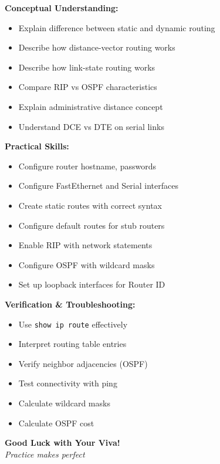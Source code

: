 \documentclass[12pt,a4paper]{article}
\begin{document}
\begin{tcolorbox}[colback=highlight!15,colframe=highlight,title=\textbf{Before Your Viva},rounded corners,breakable]
\textbf{Conceptual Understanding:}
\begin{itemize}[noitemsep]
    \item[$\Box$] Explain difference between static and dynamic routing
    \item[$\Box$] Describe how distance-vector routing works
    \item[$\Box$] Describe how link-state routing works
    \item[$\Box$] Compare RIP vs OSPF characteristics
    \item[$\Box$] Explain administrative distance concept
    \item[$\Box$] Understand DCE vs DTE on serial links
\end{itemize}

\vspace{0.3cm}
\textbf{Practical Skills:}
\begin{itemize}[noitemsep]
    \item[$\Box$] Configure router hostname, passwords
    \item[$\Box$] Configure FastEthernet and Serial interfaces
    \item[$\Box$] Create static routes with correct syntax
    \item[$\Box$] Configure default routes for stub routers
    \item[$\Box$] Enable RIP with network statements
    \item[$\Box$] Configure OSPF with wildcard masks
    \item[$\Box$] Set up loopback interfaces for Router ID
\end{itemize}

\vspace{0.3cm}
\textbf{Verification \& Troubleshooting:}
\begin{itemize}[noitemsep]
    \item[$\Box$] Use \texttt{show ip route} effectively
    \item[$\Box$] Interpret routing table entries
    \item[$\Box$] Verify neighbor adjacencies (OSPF)
    \item[$\Box$] Test connectivity with ping
    \item[$\Box$] Calculate wildcard masks
    \item[$\Box$] Calculate OSPF cost
\end{itemize}
\end{tcolorbox}

\vfill

\begin{center}
\begin{tcolorbox}[colback=primary!10,colframe=primary,width=0.7\textwidth]
\begin{center}
\textbf{\large Good Luck with Your Viva!}\\[0.2cm]
\textit{Practice makes perfect}
\end{center}
\end{tcolorbox}
\end{center}
\end{document}

